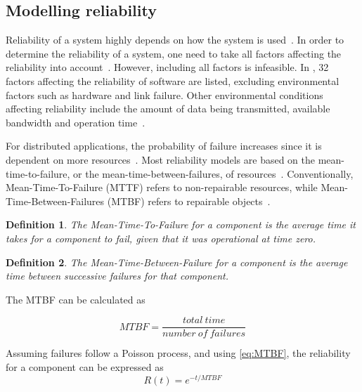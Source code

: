 \documentclass{cslthse-msc}
\newtheorem{definition}{Definition}[chapter]
\begin{document}
\subsection{Modelling reliability} \label{subsec:background_modelling_rel}
Reliability of a system highly depends on how the system is used~\cite{surveyRelPrediction}. In order to determine the reliability of a system, one need to take all factors affecting the reliability into account~\cite{surveyReliabilityDistr}. However, including all factors is infeasible. In \cite{factorsAffectingRel}, 32 factors affecting the reliability of software are listed, excluding environmental factors such as hardware and link failure. Other environmental conditions affecting reliability include the amount of data being transmitted, available bandwidth and operation time~\cite{cloudServiceRel, hierarchicalRelModeling}.

For distributed applications, the probability of failure increases since it is dependent on more resources~\cite{relModelDistSimSystem}. Most reliability models are based on the mean-time-to-failure, or the mean-time-between-failures, of resources~\cite{relModelAnalysis}. Conventionally, Mean-Time-To-Failure (MTTF) refers to non-repairable resources, while Mean-Time-Between-Failures (MTBF) refers to repairable objects~\cite{effTaskReplMobGrid}.

\begin{definition} \label{def:mttf}
The Mean-Time-To-Failure for a component is the average time it takes for a component to fail, given that it was operational at time zero.
\end{definition}

\begin{definition} \label{def:MTBF}
The Mean-Time-Between-Failure for a component is the average time between successive failures for that component.
\end{definition}

The MTBF can be calculated as

\begin{equation} \label{eq:MTBF}
MTBF = \frac{total\ time}{number\ of\ failures}
\end{equation}

Assuming failures follow a Poisson process, and using \cref{eq:MTBF}, the reliability for a component can be expressed as 
\begin{equation} \label{eq:resource_reliability}
R(t) = e^{-t/MTBF}
\end{equation}
\end{document}
